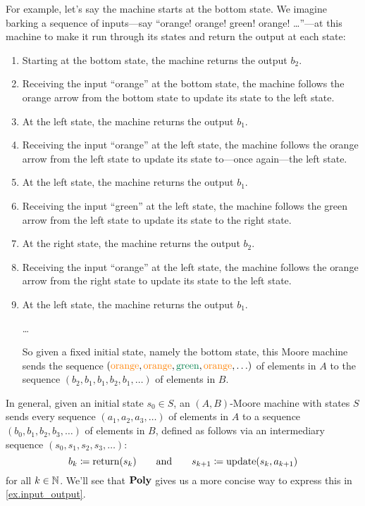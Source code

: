 \documentclass[Book-Poly]{subfiles}
\begin{document}
\begin{example}
For example, let's say the machine starts at the bottom state.
We imagine barking a sequence of inputs---say ``{\color{orange}orange! orange!} {\color{dgreen}green!} {\color{orange}orange!} \ldots''---at this machine to make it run through its states and return the output at each state:
\begin{enumerate}
    \item Starting at the bottom state, the machine returns the output $b_2$.
    \item Receiving the input ``{\color{orange}orange}'' at the bottom state, the machine follows the {\color{orange}orange} arrow from the bottom state to update its state to the left state.
    \item At the left state, the machine returns the output $b_1$.
    \item Receiving the input ``{\color{orange}orange}'' at the left state, the machine follows the {\color{orange}orange} arrow from the left state to update its state to---once again---the left state.
    \item At the left state, the machine returns the output $b_1$.
    \item Receiving the input ``{\color{dgreen}green}'' at the left state, the machine follows the {\color{dgreen}green} arrow from the left state to update its state to the right state.
    \item At the right state, the machine returns the output $b_2$.
    \item Receiving the input ``{\color{orange}orange}'' at the left state, the machine follows the {\color{orange}orange} arrow from the right state to update its state to the left state.
    \item At the left state, the machine returns the output $b_1$.

    \ldots

    So given a fixed initial state, namely the bottom state, this Moore machine sends the sequence $({\color{orange}\text{orange}}, {\color{orange}\text{orange}}, {\color{dgreen}\text{green}}, {\color{orange}\text{orange}},\ldots)$ of elements in $A$ to the sequence $(b_2,b_1,b_1,b_2,b_1,\ldots)$ of elements in $B$.
\end{enumerate}
\end{example}

In general, given an initial state $s_0\in S$, an $(A,B)$-Moore machine with states $S$ sends every sequence $(a_1,a_2,a_3,\ldots)$ of elements in $A$ to a sequence $(b_0,b_1,b_2,b_3,\ldots)$ of elements in $B$, defined as follows via an intermediary sequence $(s_0,s_1,s_2,s_3,\ldots)$:
\[
    b_k\coloneqq \text{return}(s_k) \qquad\text{and}\qquad s_{k+1}\coloneqq \text{update}(s_k, a_{k+1})
\]
for all $k\in\mathbb{N}$.
We'll see that $\mathbf{Poly}$ gives us a more concise way to express this in \cref{ex.input_output}.
\end{document}
